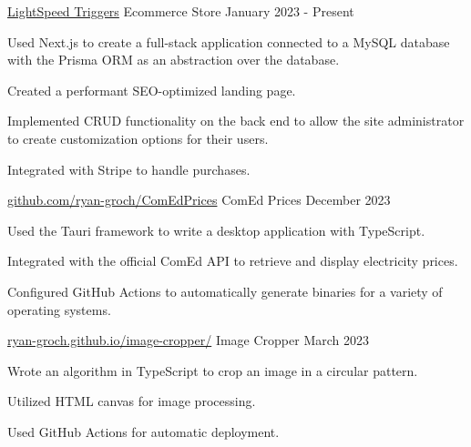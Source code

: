 

\begin{cventries}

  \cventry
    {\href{https://lightspeedtriggers.com}{LightSpeed Triggers}} %
    {Ecommerce Store} %
    {January 2023 - Present} %
    {} %
    {
      \begin{cvitems} %
        \item {Used Next.js to create a full-stack application connected to a MySQL database with the Prisma ORM as an abstraction over the database.}
        \item {Created a performant SEO-optimized landing page.}
        \item {Implemented CRUD functionality on the back end to allow the site administrator to create customization options for their users.}
        \item {Integrated with Stripe to handle purchases.}
      \end{cvitems}
    }


  \cventry
  {\href{https://github.com/ryan-groch/ComEdPrices}{github.com/ryan-groch/ComEdPrices}} %
  {ComEd Prices} %
  {December 2023} %
  {} %
  {
    \begin{cvitems} %
      \item {Used the Tauri framework to write a desktop application with TypeScript.}
      \item {Integrated with the official ComEd API to retrieve and display electricity prices.}
      \item {Configured GitHub Actions to automatically generate binaries for a variety of operating systems.}
    \end{cvitems}
  }

\cventry
{\href{https://ryan-groch.github.io/image-cropper/}{ryan-groch.github.io/image-cropper/}} %
{Image Cropper} %
{March 2023} %
{} %
{
  \begin{cvitems} %
    \item {Wrote an algorithm in TypeScript to crop an image in a circular pattern.}
    \item {Utilized HTML canvas for image processing.}
    \item {Used GitHub Actions for automatic deployment.}
  \end{cvitems}
}


\end{cventries}

